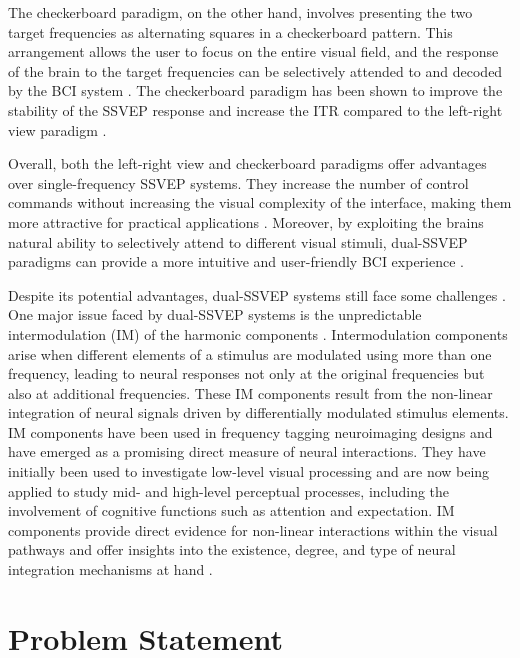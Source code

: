 The checkerboard paradigm, on the other hand, involves presenting the two target frequencies as alternating squares in a checkerboard pattern. This arrangement allows the user to focus on the entire visual field, and the response of the brain to the target frequencies can be selectively attended to and decoded by the BCI system \cite{min2014neuroimaging,cao2020highperformance,chen2015filter}. The checkerboard paradigm has been shown to improve the stability of the SSVEP response and increase the ITR compared to the left-right view paradigm \cite{min2014neuroimaging,cao2020highperformance,pan2011detecting}.

Overall, both the left-right view and checkerboard paradigms offer advantages over single-frequency SSVEP systems. They increase the number of control commands without increasing the visual complexity of the interface, making them more attractive for practical applications \cite{lin2017frequency,mullerputz2005steadystate}. Moreover, by exploiting the brains natural ability to selectively attend to different visual stimuli, dual-SSVEP paradigms can provide a more intuitive and user-friendly BCI experience \cite{trenado2019enhancing,bin2011vepbased}.

Despite its potential advantages, dual-SSVEP systems still face some challenges \cite{cheng2002design,shyu2010development,wang2017benchmark}. One major issue faced by dual-SSVEP systems is the unpredictable intermodulation (IM) of the harmonic components \cite{sun2023binocular}. Intermodulation components arise when different elements of a stimulus are modulated using more than one frequency, leading to neural responses not only at the original frequencies but also at additional frequencies. These IM components result from the non-linear integration of neural signals driven by differentially modulated stimulus elements. IM components have been used in frequency tagging neuroimaging designs and have emerged as a promising direct measure of neural interactions. They have initially been used to investigate low-level visual processing and are now being applied to study mid- and high-level perceptual processes, including the involvement of cognitive functions such as attention and expectation. IM components provide direct evidence for non-linear interactions within the visual pathways and offer insights into the existence, degree, and type of neural integration mechanisms at hand \cite{gordon_intermodulation_2019}.

\section{Problem Statement}

